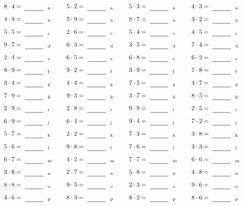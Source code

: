 \documentclass
[
  draft    = true,
  fontsize = 11pt,
  parskip  = half-
]
{scrartcl}
\begin{document}
\par\vfill\par
\begin{align*}
    \pline{8\cdot4}&=\rline{a}
  & \pline{5\cdot2}&=\rline{a}
  & \pline{5\cdot3}&=\rline{a}
  & \pline{4\cdot3}&=\rline{a} \\[1ex]
    \pline{4\cdot9}&=\rline{b}
  & \pline{5\cdot9}&=\rline{b}
  & \pline{8\cdot7}&=\rline{b}
  & \pline{3\cdot2}&=\rline{b} \\[1ex]
    \pline{5\cdot5}&=\rline{c}
  & \pline{2\cdot6}&=\rline{c}
  & \pline{5\cdot4}&=\rline{c}
  & \pline{4\cdot5}&=\rline{c} \\[1ex]
    \pline{9\cdot7}&=\rline{d}
  & \pline{6\cdot3}&=\rline{d}
  & \pline{3\cdot5}&=\rline{d}
  & \pline{7\cdot4}&=\rline{d} \\[1ex]
    \pline{2\cdot4}&=\rline{e}
  & \pline{6\cdot5}&=\rline{e}
  & \pline{6\cdot8}&=\rline{e}
  & \pline{6\cdot2}&=\rline{e} \\[1ex]
    \pline{8\cdot9}&=\rline{f}
  & \pline{9\cdot2}&=\rline{f}
  & \pline{3\cdot9}&=\rline{f}
  & \pline{7\cdot8}&=\rline{f} \\[1ex]
    \pline{3\cdot4}&=\rline{g}
  & \pline{4\cdot4}&=\rline{g}
  & \pline{7\cdot5}&=\rline{g}
  & \pline{4\cdot7}&=\rline{g} \\[1ex]
    \pline{7\cdot9}&=\rline{h}
  & \pline{9\cdot3}&=\rline{h}
  & \pline{3\cdot7}&=\rline{h}
  & \pline{8\cdot5}&=\rline{h} \\[1ex]
    \pline{2\cdot9}&=\rline{i}
  & \pline{2\cdot8}&=\rline{i}
  & \pline{9\cdot9}&=\rline{i}
  & \pline{2\cdot5}&=\rline{i} \\[1ex]
    \pline{6\cdot9}&=\rline{j}
  & \pline{6\cdot4}&=\rline{j}
  & \pline{9\cdot4}&=\rline{j}
  & \pline{7\cdot2}&=\rline{j} \\[1ex]
    \pline{5\cdot7}&=\rline{k}
  & \pline{2\cdot2}&=\rline{k}
  & \pline{7\cdot3}&=\rline{k}
  & \pline{3\cdot8}&=\rline{k} \\[1ex]
    \pline{5\cdot6}&=\rline{l}
  & \pline{9\cdot8}&=\rline{l}
  & \pline{7\cdot6}&=\rline{l}
  & \pline{3\cdot3}&=\rline{l} \\[1ex]
    \pline{6\cdot7}&=\rline{m}
  & \pline{4\cdot2}&=\rline{m}
  & \pline{7\cdot7}&=\rline{m}
  & \pline{6\cdot6}&=\rline{m} \\[1ex]
    \pline{3\cdot6}&=\rline{n}
  & \pline{2\cdot7}&=\rline{n}
  & \pline{5\cdot8}&=\rline{n}
  & \pline{4\cdot8}&=\rline{n} \\[1ex]
    \pline{8\cdot8}&=\rline{o}
  & \pline{9\cdot5}&=\rline{o}
  & \pline{2\cdot3}&=\rline{o}
  & \pline{9\cdot6}&=\rline{o} \\[1ex]
    \pline{4\cdot6}&=\rline{p}
  & \pline{8\cdot3}&=\rline{p}
  & \pline{8\cdot2}&=\rline{p}
  & \pline{8\cdot6}&=\rline{p}
\end{align*}
\end{document}
